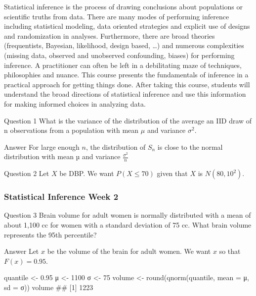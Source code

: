 \begin{frame}[fragile]

Statistical inference is the process of drawing conclusions about populations or scientific truths from data. There are many modes of performing inference including statistical modeling, data oriented strategies and explicit use of designs and randomization in analyses. Furthermore, there are broad theories (frequentists, Bayesian, likelihood, design based, …) and numerous complexities (missing data, observed and unobserved confounding, biases) for performing inference. A practitioner can often be left in a debilitating maze of techniques, philosophies and nuance. This course presents the fundamentals of inference in a practical approach for getting things done. After taking this course, students will understand the broad directions of statistical inference and use this information 
for making informed choices in analyzing data.

\end{frame}
\begin{frame}[fragile]
Question 1
What is the variance of the distribution of the average an IID draw of n observations from a population with mean \(μ\) and variance \(σ^2\).

Answer
For large enough \(n\), the distribution of \(S_n\) is close to the normal distribution with mean \(µ\) and variance \(\frac{σ^2}{n}\)


\end{frame}
\begin{frame}[fragile]

Question 2
Let \(X\) be DBP. We want \(P(X \leq 70)\) given that \(X\) is \(N(80, 10^2)\).


\end{frame}
\begin{frame}[fragile]
\frametitle{ Statistical Inference Week 2}
Question 3
Brain volume for adult women is normally distributed with a mean of about 1,100 cc for women with a standard deviation of 75 cc. What brain volume represents the 95th percentile?

Answer
Let \(x\) be the volume of the brain for adult women. We want \(x\) so that \(F(x) = 0.95\).

quantile <- 0.95
μ <- 1100
σ <- 75
volume <- round(qnorm(quantile, mean = μ, sd = σ))
volume
## [1] 1223

\end{frame}
